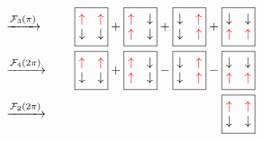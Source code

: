 \documentclass[prl,aps,twocolumn,showpacs,superscriptaddress,longbibliography]{revtex4-1}
\begin{document}
\begin{eqnarray}
	& \xrightarrow[]{\mathcal{F}_3(\pi)} &
\phantom{-i \,}\boxed{
\begin{matrix}
  {\color{red} \uparrow} & {\color{red} \uparrow} \\
  \downarrow & \downarrow
 \end{matrix}
}
+
\boxed{
\begin{matrix}
  {\color{red} \uparrow} & \downarrow \\
  {\color{red} \uparrow} & \downarrow
 \end{matrix}
}
+
\boxed{
\begin{matrix}
  \downarrow & {\color{red} \uparrow} \\
  \downarrow & {\color{red} \uparrow}
 \end{matrix}
}
+
\boxed{
\begin{matrix}
  \downarrow & \downarrow \\
  {\color{red} \uparrow} & {\color{red} \uparrow}
 \end{matrix}
} 
\nonumber \\
	& \xrightarrow[]{\mathcal{F}_4(2\pi)} &
\phantom{-i \,}\boxed{
\begin{matrix}
  {\color{red} \uparrow} & {\color{red} \uparrow} \\
  \downarrow & \downarrow
 \end{matrix}
}
+
\boxed{
\begin{matrix}
  {\color{red} \uparrow} & \downarrow \\
  {\color{red} \uparrow} & \downarrow
 \end{matrix}
}
-
\boxed{
\begin{matrix}
  \downarrow & {\color{red} \uparrow} \\
  \downarrow & {\color{red} \uparrow}
 \end{matrix}
}
-
\boxed{
\begin{matrix}
  \downarrow & \downarrow \\
  {\color{red} \uparrow} & {\color{red} \uparrow}
 \end{matrix}
} 
\nonumber \\
	& \xrightarrow[]{\mathcal{F}_2(2\pi)} &
\phantom{-i \,}\boxed{
\begin{matrix}
  {\color{red} \uparrow} & {\color{red} \uparrow} \\
  \downarrow & \downarrow
 \end{matrix}
}
\end{eqnarray}
\end{document}
